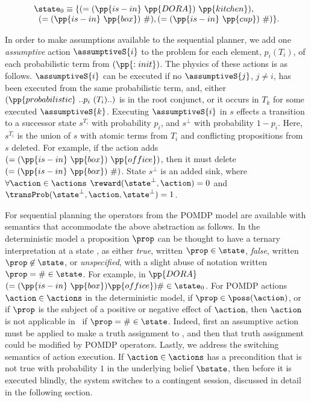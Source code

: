 \[
\begin{array}{l}
\state_0 \equiv \{(=(\pp{is-in}~\pp{DORA})~\pp{kitchen}),\\
\;\;(=(\pp{is-in}~\pp{box})~\#), (=(\pp{is-in}~\pp{cup})~\#)\}.
\end{array}
\]

In order to make assumptions available to the sequential planner, we
add one {\em assumptive} action $\assumptiveS{i}$ to the problem for
each element, $p_i (T_i)$, of each probabilistic term from
$(\pp{:init})$. The physics of these actions is as
follows. $\assumptiveS{i}$ can be executed if no $\assumptiveS{j}$,
$j \neq i$, has been executed from the same probabilistic term, and,
either $(\pp{probabilistic}~..p_i~(T_i)..)$ is in the root conjunct,
or it occurs in $T_k$ for some executed $\assumptiveS{k}$.
Executing $\assumptiveS{i}$ in $s$ effects a transition to a successor
state $s^{T_i}$ with probability $p_i$, and $s^\bot$ with probability
$1 - p_i$. Here, $s^{T_i}$ is the union of $s$ with atomic terms from
$T_i$ and conflicting propositions from $s$ deleted. For example, if
the action adds $(=(\pp{is-in}~\pp{box})~\pp{office})$, then it must
delete $(=(\pp{is-in}~\pp{box})~\#)$. State $s^\bot$ is an added sink,
where $\forall\action\in\actions$ $\reward(\state^\bot, \action) = 0$
and $\transProb(\state^\bot, \action, \state^\bot) = 1$.

For sequential planning the operators from the POMDP model are
available with semantics that accommodate the above abstraction as
follows. In the deterministic model a proposition $\prop$ can be
thought to have a ternary interpretation at a state \state, as either
{\em true}, written $\prop\in\state$, {\em false}, written
$\prop\not\in\state$, or {\em unspecified}, with a slight abuse of
notation written $\prop=\#\in\state$. For example, in $\pp{DORA}$
$(=(\pp{is-in}~\pp{box})\pp{office})\#\in\state_0$. For POMDP actions
$\action\in\actions$ in the deterministic model, if
$\prop \in \poss(\action)$, or if $\prop$ is the subject of a positive
or negative effect of $\action$, then $\action$ is not applicable
in \state\ if $\prop=\#\in\state$. Indeed, first an assumptive action
must be applied to make a truth assignment to \prop, and then that
truth assignment could be modified by POMDP operators. Lastly, we
address the switching semantics of action execution. If
$\action\in\actions$ has a precondition that is not true with
probability $1$ in the underlying belief $\bstate$, then before it is
executed blindly, the system switches to a contingent session,
discussed in detail in the following section.


